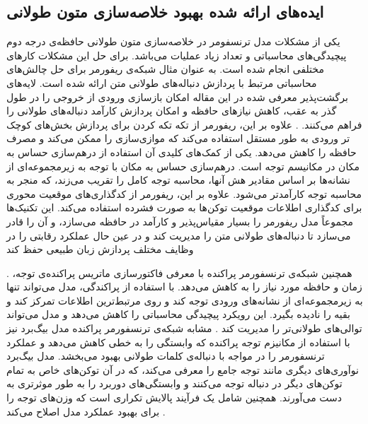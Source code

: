 


\subsection{ایده‌های ارائه شده بهبود خلاصه‌سازی متون طولانی }


یکی از مشکلات مدل ترنسفومر در خلاصه‌سازی متون طولانی حافظه‌ی درجه دوم پیچیدگی‌های محاسباتی و تعداد زیاد عملیات می‌باشد. برای حل این مشکلات کار‌های مختلفی انجام شده است. به عنوان مثال شبکه‌ی ریفورمر
برای حل چالش‌های محاسباتی مرتبط با پردازش دنباله‌های طولانی متن ارائه شده است. لایه‌های برگشت‌پذیر
معرفی شده در این مقاله امکان بازسازی ورودی از خروجی را در طول گذر به عقب، کاهش نیازهای حافظه و امکان پردازش کارآمد دنباله‌های طولانی را فراهم می‌کنند.
. علاوه بر این، ریفورمر از تکه تکه کردن برای پردازش بخش‌های کوچک تر ورودی به طور مستقل استفاده می‌کند که موازی‌سازی را ممکن می‌کند و مصرف حافظه را کاهش می‌دهد. یکی از کمک‌های کلیدی آن استفاده از درهم‌سازی حساس به مکان 
 در مکانیسم توجه
است. درهم‌سازی حساس به مکان با توجه به زیرمجموعه‌ای از نشانه‌ها بر اساس مقادیر هش آنها، محاسبه توجه کامل را تقریب می‌زند، که منجر به محاسبه توجه کارآمدتر می‌شود. علاوه بر این، ریفورمر از کدگذاری‌های موقعیت محوری برای کدگذاری اطلاعات موقعیت توکن‌ها به صورت فشرده استفاده می‌کند. این تکنیک‌ها مجموعاً مدل ریفورمر را بسیار مقیاس‌پذیر و کارآمد در حافظه می‌سازد، و آن را قادر می‌سازد تا دنباله‌های طولانی متن را مدیریت کند و در عین حال عملکرد رقابتی را در وظایف مختلف پردازش زبان طبیعی حفظ کند
\cite{reformer}

. همچنین شبکه‌ی ترنسفورمر پراکنده 
با معرفی فاکتورسازی‌ ماتریس پراکنده‌ی توجه، زمان و حافظه مورد نیاز را به کاهش می‌دهد.
با استفاده از پراکندگی، مدل می‌تواند تنها به زیرمجموعه‌ای از نشانه‌های ورودی توجه کند و روی مرتبط‌ترین اطلاعات تمرکز کند و بقیه را نادیده بگیرد. این رویکرد پیچیدگی محاسباتی را کاهش می‌دهد و مدل می‌تواند توالی‌های طولانی‌تر را مدیریت کند
\cite{child2019generating}
. مشابه شبکه‌ی ترنسفورمر پراکنده مدل بیگ‌برد نیز
با استفاده از مکانیزم توجه پراکنده
که وابستگی را به خطی کاهش ‌می‌دهد و عملکرد ترنسفورمر را در مواجه با دنباله‌ی کلمات
طولانی بهبود می‌بخشد. مدل بیگ‌برد نوآوری‌های دیگری مانند توجه جامع
را معرفی می‌کند، که در آن توکن‌های خاص به تمام توکن‌های دیگر در دنباله توجه می‌کنند و وابستگی‌های دوربرد را به طور موثرتری به دست می‌آورند. همچنین شامل یک فرآیند پالایش تکراری است که وزن‌های توجه را برای بهبود عملکرد مدل اصلاح می‌کند
\cite{zaheer2020big}. 



